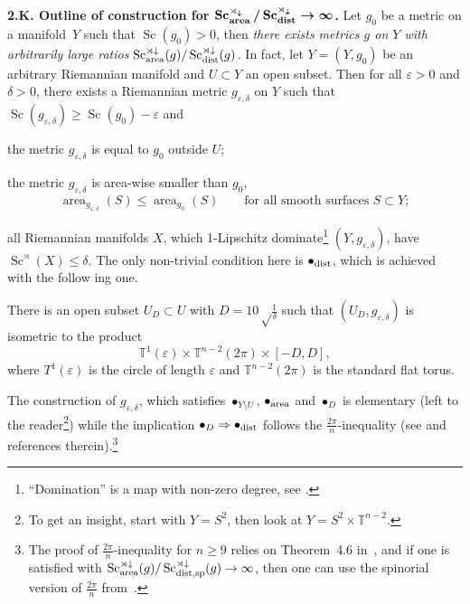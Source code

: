 \documentclass[10pt,a4paper]{amsart}
\numberwithin{equation}{section}
\begin{document}
\textbf{2.K. Outline of construction for $\boldsymbol{\operatorname{Sc}^{\rtimes_\downarrow}_{\rm area}/\operatorname{Sc}_{\rm dist}^{\rtimes_\downarrow}\to\infty}$.}
Let $g_0$ be a metric on a manifold~$Y$ such that $\operatorname{Sc}(g_0)>0$, then
{\it there exists metrics $g$ on $Y$ with arbitrarily large ratios $\operatorname{Sc}^{\rtimes\downarrow}_{\rm area}(g)/\operatorname{Sc}_{\rm dist}^{\rtimes\downarrow}(g)$.}
In fact, let $Y=(Y,g_0) $ be an arbitrary Riemannian manifold and $U\subset Y$ an open subset.
Then
for all $\varepsilon >0$ and $\delta>0$, there exists a Riemannian metric $g_{\varepsilon, \delta}$ on $Y$
 such that $ \operatorname{Sc}( g_{\varepsilon, \delta})\geq \operatorname{Sc}(g_0)-\varepsilon$ and
\begin{description}\itemsep=0pt\setlength{\leftskip}{0.50cm}
\item[$\bullet_{Y\setminus U}$] the metric $g_{\varepsilon, \delta}$ is equal to $g_0$ outside $U$;
\item[$\bullet_{\rm area}$] the metric $g_{\varepsilon, \delta}$ is area-wise smaller than $g_0$,
\[
\operatorname{area}_{g_{\varepsilon, \delta}}(S)\leq \operatorname{area}_{g_0}(S)\qquad \text{for all smooth surfaces $S\subset Y$};
\]
\item[$\bullet_{\rm dist}$] all Riemannian manifolds $X$, which 1-Lipschitz dominate\footnote{``Domination'' is a map with non-zero degree, see  \cite[\S1.5]{Gr2021}.}
 $(Y,g_{\varepsilon, \delta})$, have
$\operatorname{Sc}^\rtimes (X)\leq \delta$.
The only non-trivial condition here is $\bullet_{\rm dist}$, which is achieved with the follow ing
 one.
\item[$\bullet_{D}$] There is an open subset $U_D\subset U $ with $D=10\sqrt \frac {1}{\delta}$ such that
$(U_D, g_{\varepsilon, \delta})$ is isometric to the product
\[
\mathbb T^1(\varepsilon)\times \mathbb T^{n-2}(2\pi) \times [-D,D],
\]
where $T^1(\varepsilon)$ is the circle of length $\varepsilon$ and $\mathbb T^{n-2}(2\pi)$ is the standard flat torus.
\end{description}

The construction of $g_{\varepsilon, \delta}$, which satisfies $\bullet_{Y\setminus U}$,
$\bullet_{\rm area}$ and $\bullet_{D}$ is elementary (left to the reader\footnote{To get an insight, start with
$Y=S^2$, then look at $Y=S^2\times \mathbb T^{n-2}$.})
while the implication $\bullet_{D}\Rightarrow \bullet_{\rm dist}$ follows
the $\frac{2\pi}{n}$-inequality (see \cite[\S3.6]{Gr2021} and references therein).\footnote{The proof of $\frac{2\pi}{n}$-inequality for $n\geq 9$
relies on Theorem~4.6 in~\cite{SY2017}, and if one is satisfied with
$\operatorname{Sc}^{\rtimes\downarrow}_{\rm area}(g)/\operatorname{Sc}_{{\rm dist,sp}}^{\rtimes\downarrow}(g)\to \infty$, then one can use the spinorial version of
$\frac{2\pi}{n}$ from~\cite{Ze2019}.}
\end{document}
